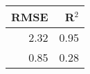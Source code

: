 \begin{table}[ht]
\centering
\begin{tabular}{rr}
  \hline
RMSE & R$^{2}$ \\ 
  \hline
2.32 & 0.95 \\ 
  0.85 & 0.28 \\ 
   \hline
\end{tabular}
\end{table}
